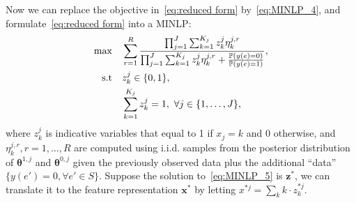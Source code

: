 Now we can replace the objective in~\eqref{eq:reduced form} by~\eqref{eq:MINLP_4}, and formulate~\eqref{eq:reduced form} into a MINLP:
\begin{equation}
  \begin{split}
    \max \quad & \sum_{r = 1}^R \frac{\prod_{j=1}^J \sum_{k=1}^{K_j} z^j_k \eta^{j, r}_k}
    {\prod_{j=1}^J \sum_{k=1}^{K_j} z^j_k \eta^{j, r}_k + \frac{\mathbb{P} \left(y(e) = 0 \right)}{\mathbb{P} \left( y(e) = 1 \right)}}, \\
    \text{s.t} \quad &z^j_k \in \{0,1\}, \\
    &\sum_{k=1}^{K_j} z^j_k = 1, \,\, \forall j \in \{1, \ldots, J\},
  \end{split}
  \label{eq:MINLP_5}
\end{equation}
where $z^j_k$ is indicative variables that equal to 1 if $x_j = k$ and 0 otherwise, and $\eta_k^{j,r}, r=1,\ldots,R$ are computed using i.i.d. samples from
the posterior distribution of $\bm{\theta}^{1, j}$ and $\bm{\theta}^{0, j}$ given the previously observed data plus the additional ``data'' $\{y(e')=0, \forall e' \in S\}$.
Suppose the solution to~\eqref{eq:MINLP_5} is $\bm{z}^*$, we can translate it to the feature representation $\bm{x}^*$ by letting $x^{*j} = \sum_k k \cdot z^{*j}_k$.

